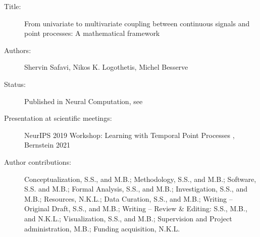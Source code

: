 \begin{description}
\item[Title:]
  From univariate to multivariate coupling between continuous signals and point processes: A mathematical framework
\item[Authors:]
  Shervin Safavi, Nikos K. Logothetis, Michel Besserve
\item[Status:] 
  Published in Neural Computation, see \citet{safaviUnivariateMultivariateCoupling2021}
\item[Presentation at scientific meetings:]
  NeurIPS 2019 Workshop: Learning with Temporal Point Processes
  \cite{safaviMultivariateCouplingEstimation2019},
  Bernstein 2021 \cite{safaviGeneralizedPhaseLocking2021}  
\item[Author contributions: ]

  Conceptualization, S.S., and M.B.;
  Methodology, S.S., and M.B.;
  Software, S.S. and M.B.;
  Formal Analysis, S.S., and M.B.;
  Investigation, S.S., and M.B.;
  Resources, N.K.L.;
  Data Curation, S.S., and M.B.;
  Writing -- Original Draft, S.S., and M.B.;
  Writing -- Review \& Editing: S.S., M.B., and N.K.L.;
  Visualization, S.S., and M.B.;
  Supervision and Project administration, M.B.;
  Funding acquisition, N.K.L.
  
\end{description}


